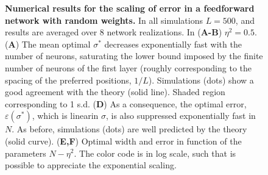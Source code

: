 \documentclass[a4paper]{article}%
\begin{document}
\begin{figure}[p]
\centering
{}\caption{ \textbf{Numerical
results for the scaling of error in a feedforward network with random
weights.} In all simulations $L=500$, and results are averaged over 8 network
realizations. In (\textbf{A-B}) $\eta^{2} =0.5$.(\textbf{A}) The mean optimal $\sigma^{*}$
decreases exponentially fast with the number of neurons, saturating the lower
bound imposed by the finite number of neurons of the first layer (roughly corresponding to the spacing of the preferred positions, $1/L$). Simulations
(dots) show a good agreement with the theory (solid line). Shaded region
corresponding to 1 s.d. (\textbf{D}) As a consequence, the optimal error,
$\varepsilon(\sigma^{*})$, which is linearin $\sigma$, is also suppressed
exponentially fast in $N$. As before, simulations (dots) are well predicted by
the theory (solid curve). (\textbf{E,F}) Optimal width and error in function
of the parameters  $N-\eta^{2}$. The color code is in log scale, such that is
possible to appreciate the exponential scaling. }
\label{Fig:4}
\end{figure}\clearpage
\end{document}
